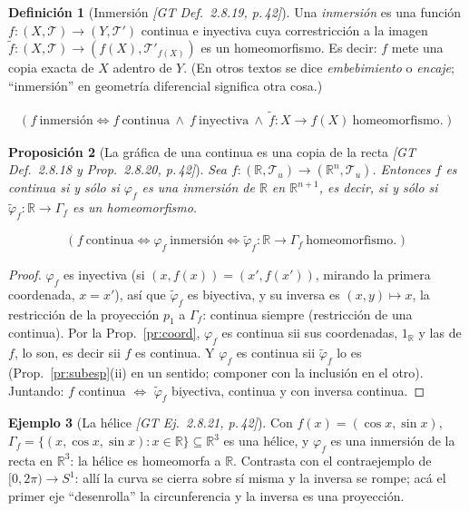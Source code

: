 \documentclass[11pt,a4paper]{article}
\newcommand{\lgc}[1]{\par\vspace{-3pt}\begin{gather*}\big(\;#1\;\big)\end{gather*}\vspace{-6pt}}
\theoremstyle{definition}
\newtheorem{definicion}{Definición}[section]
\newtheorem{ejemplo}[definicion]{Ejemplo}
\theoremstyle{plain}
\newtheorem{proposicion}[definicion]{Proposición}
\newcommand{\fnt}[1]{{\normalfont\small\itshape\color{gray!150!black}[#1]}}
\newcommand{\R}{\mathbb{R}}
\newcommand{\tp}{\mathcal{T}}
\begin{document}
\begin{definicion}[Inmersión \fnt{GT Def.\ 2.8.19, p.\,42}]
Una \emph{inmersión} es una función $f:(X,\tp)\to(Y,\tp')$ continua e inyectiva cuya correstricción a la imagen $\widetilde f:(X,\tp)\to(f(X),\tp'_{f(X)})$ es un homeomorfismo. Es decir: $f$ mete una copia exacta de $X$ adentro de $Y$. (En otros textos se dice \emph{embebimiento} o \emph{encaje}; ``inmersión'' en geometría diferencial significa otra cosa.)
\lgc{f\ \text{inmersión}\iff f\ \text{continua}\ \wedge\ f\ \text{inyectiva}\ \wedge\ \widetilde f:X\to f(X)\ \text{homeomorfismo}.}
\end{definicion}

\begin{proposicion}[La gráfica de una continua es una copia de la recta \fnt{GT Def.\ 2.8.18 y Prop.\ 2.8.20, p.\,42}]\label{hu:grafica}
Sea $f:(\R,\tp_u)\to(\R^n,\tp_u)$. Entonces $f$ es continua si y sólo si $\varphi_f$ es una inmersión de $\R$ en $\R^{n+1}$, es decir, si y sólo si $\widetilde\varphi_f:\R\to\Gamma_f$ es un homeomorfismo.
\lgc{f\ \text{continua}\iff \varphi_f\ \text{inmersión}\iff \widetilde\varphi_f:\R\to\Gamma_f\ \text{homeomorfismo}.}
\end{proposicion}

\begin{proof}
$\varphi_f$ es inyectiva (si $(x,f(x))=(x',f(x'))$, mirando la primera coordenada, $x=x'$), así que $\widetilde\varphi_f$ es biyectiva, y su inversa es $(x,y)\mapsto x$, la restricción de la proyección $p_1$ a $\Gamma_f$: continua siempre (restricción de una continua). Por la Prop.~\ref{pr:coord}, $\varphi_f$ es continua sii sus coordenadas, $1_\R$ y las de $f$, lo son, es decir sii $f$ es continua. Y $\varphi_f$ es continua sii $\widetilde\varphi_f$ lo es (Prop.~\ref{pr:subesp}(ii) en un sentido; componer con la inclusión en el otro). Juntando: $f$ continua $\iff$ $\widetilde\varphi_f$ biyectiva, continua y con inversa continua.
\end{proof}

\begin{ejemplo}[La hélice \fnt{GT Ej.\ 2.8.21, p.\,42}]
Con $f(x)=(\cos x,\sin x)$, $\Gamma_f=\{(x,\cos x,\sin x): x\in\R\}\subseteq\R^3$ es una hélice, y $\varphi_f$ es una inmersión de la recta en $\R^3$: la hélice es homeomorfa a $\R$. Contrasta con el contraejemplo de $[0,2\pi)\to S^1$: allí la curva se cierra sobre sí misma y la inversa se rompe; acá el primer eje ``desenrolla'' la circunferencia y la inversa es una proyección.
\end{ejemplo}
\end{document}
